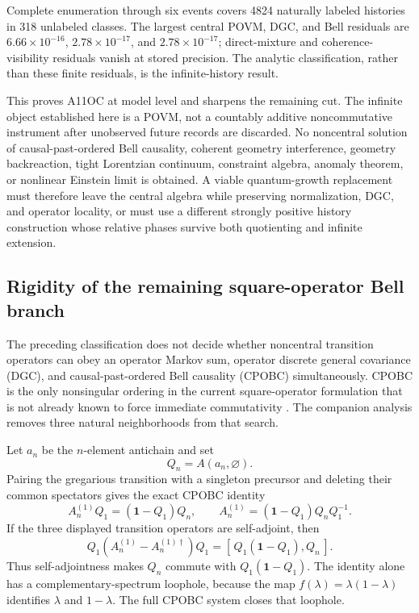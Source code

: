 Complete enumeration through six events covers 4824 naturally labeled
histories in 318 unlabeled classes.  The largest central POVM, DGC, and
Bell residuals are \(6.66\times10^{-16}\),
\(2.78\times10^{-17}\), and \(2.78\times10^{-17}\); direct-mixture and
coherence-visibility residuals vanish at stored precision.  The analytic
classification, rather than these finite residuals, is the infinite-history
result.

This proves A11OC at model level and sharpens the remaining cut.  The
infinite object established here is a POVM, not a countably additive
noncommutative instrument after unobserved future records are discarded.
No noncentral solution of causal-past-ordered Bell causality, coherent
geometry interference, geometry backreaction, tight Lorentzian continuum,
constraint algebra, anomaly theorem, or nonlinear Einstein limit is
obtained.  A viable quantum-growth replacement must therefore leave the
central algebra while preserving normalization, DGC, and operator locality,
or must use a different strongly positive history construction whose
relative phases survive both quotienting and infinite extension.

\subsection{Rigidity of the remaining square-operator Bell branch}
\label{sec:bell-causal-rigidity}

The preceding classification does not decide whether noncentral transition
operators can obey an operator Markov sum, operator discrete general
covariance (DGC), and causal-past-ordered Bell causality (CPOBC)
simultaneously.  CPOBC is the only nonsingular ordering in the current
square-operator formulation that is not already known to force immediate
commutativity \cite{SrivastavaSurya2026}.  The companion analysis
\cite{XuBellCausalGrowthRigidity2026} removes three natural neighborhoods
from that search.

Let \(a_n\) be the \(n\)-element antichain and set
\[
 Q_n=A(a_n,\varnothing).
\]
Pairing the gregarious transition with a singleton precursor and deleting
their common spectators gives the exact CPOBC identity
\begin{equation}
 A_n^{(1)}Q_1=(\mathbf1-Q_1)Q_n,
 \qquad
 A_n^{(1)}=(\mathbf1-Q_1)Q_nQ_1^{-1}.
\label{eq:bcgr-one-precursor}
\end{equation}
If the three displayed transition operators are self-adjoint, then
\begin{equation}
 Q_1\!\left(A_n^{(1)}-A_n^{(1)\dagger}\right)Q_1
 =
 [\,Q_1(\mathbf1-Q_1),Q_n\,].
\label{eq:bcgr-hermiticity}
\end{equation}
Thus self-adjointness makes \(Q_n\) commute with
\(Q_1(\mathbf1-Q_1)\).  The
identity alone has a complementary-spectrum loophole, because the map
\(f(\lambda)=\lambda(1-\lambda)\) identifies
\(\lambda\) and \(1-\lambda\).  The full CPOBC system closes that loophole.

